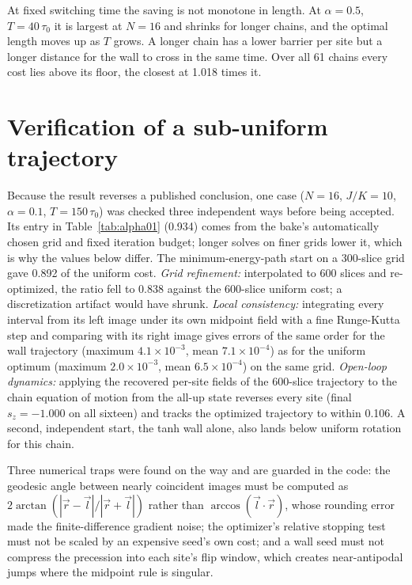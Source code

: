 \documentclass[11pt]{article}
\begin{document}
At fixed switching time the saving is not monotone in length. At $\alpha = 0.5$, $T = 40\,\tau_0$ it is
largest at $N = 16$ and shrinks for longer chains, and the optimal length moves up as $T$ grows. A
longer chain has a lower barrier per site but a longer distance for the wall to cross in the same time.
Over all 61 chains every cost lies above its floor, the closest at 1.018 times it.

\section{Verification of a sub-uniform trajectory}

Because the result reverses a published conclusion, one case ($N=16$, $J/K=10$, $\alpha=0.1$,
$T=150\,\tau_0$) was checked three independent ways before being accepted. Its entry in
Table~\ref{tab:alpha01} (0.934) comes from the bake's automatically chosen grid and fixed iteration
budget; longer solves on finer grids lower it, which is why the values below differ. The
minimum-energy-path start on a 300-slice grid gave 0.892 of the uniform cost.
\emph{Grid refinement:} interpolated to 600 slices and re-optimized, the ratio fell to 0.838 against the
600-slice uniform cost; a discretization artifact would have shrunk.
\emph{Local consistency:} integrating every interval from its left image under its own midpoint field
with a fine Runge-Kutta step and comparing with its right image gives errors of the same order for the
wall trajectory (maximum $4.1\times10^{-3}$, mean $7.1\times10^{-4}$) as for the uniform optimum
(maximum $2.0\times10^{-3}$, mean $6.5\times10^{-4}$) on the same grid.
\emph{Open-loop dynamics:} applying the recovered per-site fields of the 600-slice trajectory to the
chain equation of motion from the all-up state reverses every site (final $s_z = -1.000$ on all
sixteen) and tracks the optimized trajectory to within 0.106. A second, independent start, the tanh
wall alone, also lands below uniform rotation for this chain.

Three numerical traps were found on the way and are guarded in the code: the geodesic angle between
nearly coincident images must be computed as $2\arctan(|\vec r-\vec l|/|\vec r+\vec l|)$ rather than
$\arccos(\vec l\cdot\vec r)$, whose rounding error made the finite-difference gradient noise; the
optimizer's relative stopping test must not be scaled by an expensive seed's own cost; and a wall seed
must not compress the precession into each site's flip window, which creates near-antipodal jumps where
the midpoint rule is singular.
\end{document}
